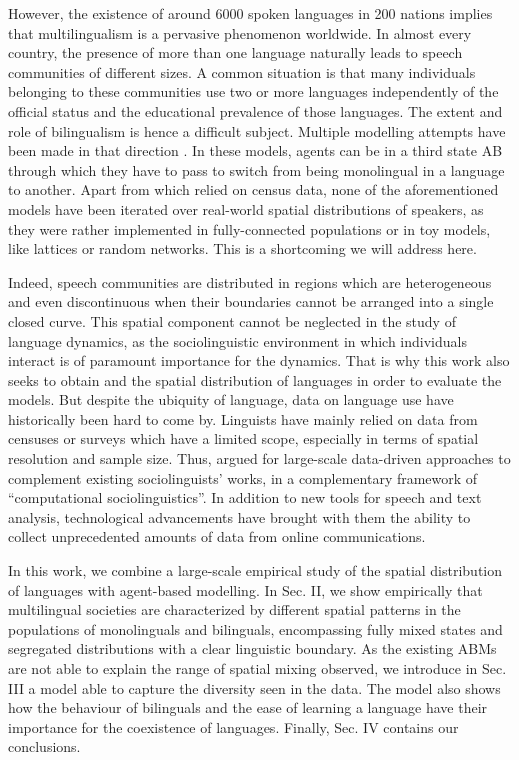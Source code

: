 \documentclass[../thesis.tex]{subfiles}
\begin{document}
However, the existence of around \SI{6000}{} spoken languages in 200 nations implies
that multilingualism is a pervasive phenomenon worldwide. In almost every country, the
presence of more than one language naturally leads to speech communities of different
sizes. A common situation is that many individuals belonging to these communities use
two or more languages independently of the official status and the educational
prevalence of those languages. The extent and role of bilingualism is hence a difficult
subject. Multiple modelling attempts have been made in that direction
\cite{CastelloOrderingDynamics2006,PatriarcaInfluenceGeography2009,PatriarcaModelingTwolanguage2012,VazquezAgentBased2010}.
In these models, agents can be in a third state AB through which they have to pass to
switch from being monolingual in a language to another. Apart from
\cite{ProchazkaQuantifyingDriving2017} which relied on census data, none of the
aforementioned models have been iterated over real-world spatial distributions of
speakers, as they were rather implemented in fully-connected populations or in toy
models, like lattices or random networks. This is a shortcoming we will address here.

Indeed, speech communities are distributed in regions which are heterogeneous and even
discontinuous when their boundaries cannot be arranged into a single closed curve. This
spatial component cannot be neglected in the study of language dynamics, as the
sociolinguistic environment in which individuals interact is of paramount importance for
the dynamics. That is why this work also seeks to obtain and the spatial distribution of
languages in order to evaluate the models. But despite the ubiquity of language, data on
language use have historically been hard to come by. Linguists have mainly relied on
data from censuses or surveys which have a limited scope, especially in terms of spatial
resolution and sample size. Thus, \cite{NguyenComputationalSociolinguistics2016} argued
for large-scale data-driven approaches to complement existing sociolinguists' works, in
a complementary framework of ``computational sociolinguistics''. In addition to new
tools for speech and text analysis, technological advancements have brought with them
the ability to collect unprecedented amounts of data from online communications.

In this work, we combine a large-scale empirical study of the spatial distribution of
languages with agent-based modelling. In Sec. II, we show empirically that multilingual
societies are characterized by different spatial patterns in the populations of
monolinguals and bilinguals, encompassing fully mixed states and segregated
distributions with a clear linguistic boundary. As the existing \acp{ABM} are not able to
explain the range of spatial mixing observed, we introduce in Sec. III a model able to
capture the diversity seen in the data. The model also shows how the behaviour of
bilinguals and the ease of learning a language have their importance for the coexistence
of languages. Finally, Sec. IV contains our conclusions.
\end{document}
